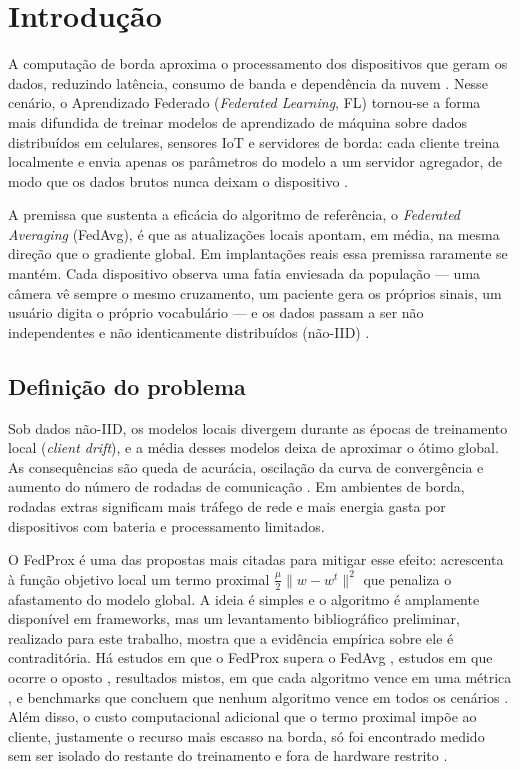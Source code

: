 \section{Introdução}
\label{introducao}

A computação de borda aproxima o processamento dos dispositivos que geram os dados, reduzindo latência, consumo de banda e dependência da nuvem \citep{shi2016edge}. Nesse cenário, o Aprendizado Federado (\textit{Federated Learning}, FL) tornou-se a forma mais difundida de treinar modelos de aprendizado de máquina sobre dados distribuídos em celulares, sensores IoT e servidores de borda: cada cliente treina localmente e envia apenas os parâmetros do modelo a um servidor agregador, de modo que os dados brutos nunca deixam o dispositivo \citep{mcmahan2017fedavg, lim2020mobileedge}.

A premissa que sustenta a eficácia do algoritmo de referência, o \textit{Federated Averaging} (FedAvg), é que as atualizações locais apontam, em média, na mesma direção que o gradiente global. Em implantações reais essa premissa raramente se mantém. Cada dispositivo observa uma fatia enviesada da população --- uma câmera vê sempre o mesmo cruzamento, um paciente gera os próprios sinais, um usuário digita o próprio vocabulário --- e os dados passam a ser não independentes e não identicamente distribuídos (não-IID) \citep{kairouz2021advances, zhao2018noniid}.

\subsection{Definição do problema}

Sob dados não-IID, os modelos locais divergem durante as épocas de treinamento local (\textit{client drift}), e a média desses modelos deixa de aproximar o ótimo global. As consequências são queda de acurácia, oscilação da curva de convergência e aumento do número de rodadas de comunicação \citep{zhao2018noniid, li2020challenges}. Em ambientes de borda, rodadas extras significam mais tráfego de rede e mais energia gasta por dispositivos com bateria e processamento limitados.

O FedProx \citep{li2020fedprox} é uma das propostas mais citadas para mitigar esse efeito: acrescenta à função objetivo local um termo proximal $\frac{\mu}{2}\lVert w - w^{t}\rVert^2$ que penaliza o afastamento do modelo global. A ideia é simples e o algoritmo é amplamente disponível em frameworks, mas um levantamento bibliográfico preliminar, realizado para este trabalho, mostra que a evidência empírica sobre ele é contraditória. Há estudos em que o FedProx supera o FedAvg \citep{mahmood2025alzheimer, julekha2026bangla}, estudos em que ocorre o oposto \citep{vajjhula2025har}, resultados mistos, em que cada algoritmo vence em uma métrica \citep{tan2026instruction}, e benchmarks que concluem que nenhum algoritmo vence em todos os cenários \citep{li2022niidbench, onlu2025aggregation}. Além disso, o custo computacional adicional que o termo proximal impõe ao cliente, justamente o recurso mais escasso na borda, só foi encontrado medido sem ser isolado do restante do treinamento e fora de hardware restrito \citep{li2022niidbench}.

